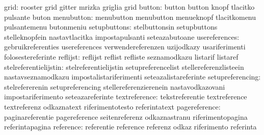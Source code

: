                             grid: rooster                          grid
                                  gitter                           mrizka
                                  griglia                          grid
                          button: button                           button
                                  knopf                            tlacitko
                                  pulsante                         buton
                      menubutton: menubutton                       menubutton
                                  menueknopf                       tlacitkomenu
                                  pulsantemenu                     butonmeniu
                    setupbuttons: stelbuttonsin                    setupbuttons
                                  stelleknopfein                   nastavtlacitka
                                  impostapulsanti                  seteazabutoane
                   usereferences: gebruikreferenties               usereferences
                                  verwendereferenzen               uzijodkazy
                                  usariferimenti                   folosestereferinte
                        reflijst: reflijst                         reflist
                                  refliste                         seznamodkazu
                                  listarif                         listaref
           stelreferentielijstin: stelreferentielijstin            setupreferencelist
                                  stellereferenzlisteein           nastavseznamodkazu
                                  impostalistariferimenti          seteazalistareferinte
                setupreferencing: stelrefererenin                  setupreferencing
                                  stellereferenzierenein           nastavodkazovani
                                  impostariferimento               seteazareferinte
                   textreference: tekstreferentie                  textreference
                                  textreferenz                     odkaznatext
                                  riferimentotesto                 referintatext
                   pagereference: paginareferentie                 pagereference
                                  seitenreferenz                   odkaznastranu
                                  riferimentopagina                referintapagina
                       reference: referentie                       reference
                                  referenz                         odkaz
                                  riferimento                      referinta
